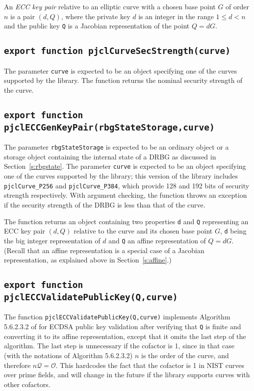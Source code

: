 \documentclass[12pt]{article}
\begin{document}
An {\em ECC key pair\/} relative to an elliptic curve with a chosen base point $G$ of order $n$ is a pair $(d,Q)$, where
the private key $d$ is an integer in the range $1 \leq d < n$ and the public key {\tt Q}
is a Jacobian representation of the point $Q=dG$.

\subsection{\tt export function pjclCurveSecStrength(curve)}

The parameter {\tt curve} is expected to be an object specifying 
one of the curves supported by the library.
The function returns the nominal security strength of the curve.

\subsection{\tt export function pjclECCGenKeyPair(rbgStateStorage,curve) }

The parameter {\tt rbgStateStorage} is expected to be an ordinary
object or a storage object containing the internal state of a DRBG 
as discussed in Section~\ref{s:rbgstate}.
The parameter {\tt curve} is expected to be an object specifying one of the curves supported by the library;
this version of the library includes {\tt pjclCurve\_P256} and {\tt pjclCurve\_P384}, which provide
128 and 192 bits of security strength respectively.
With argument checking, the function throws an exception if the security strength of the DRBG is 
less than that of the curve.

The function returns an object containing two properties {\tt d} and {\tt Q}
representing an ECC key pair $(d,Q)$ relative to the curve and its chosen base point $G$,
{\tt d} being the big integer representation of $d$ and {\tt Q} an affine representation of
$Q = dG$.  (Recall that an affine representation is a special case of a Jacobian representation,
as explained above in Section~\ref{s:affine}.)

\subsection{\tt export function pjclECCValidatePublicKey(Q,curve)}

The function {\tt pjclECCValidatePublicKey(Q,curve)} implements
Algorithm 5.6.2.3.2 of \cite{NIST-DH} for ECDSA public key validation
after verifying that {\tt Q} is finite and converting it to its affine representation,
except that it omits the last step of the algorithm.  The last step is unnecessary if the
cofactor is 1, since in that case (with the notations of Algorithm 5.6.2.3.2)
$n$ is the order of the curve, and
therefore $n\mathcal{Q} = \mathcal{O}$.  This hardcodes the fact that the cofactor is 1
in NIST curves over prime fields, and will change in the future if the library supports curves with other
cofactors.
\end{document}
